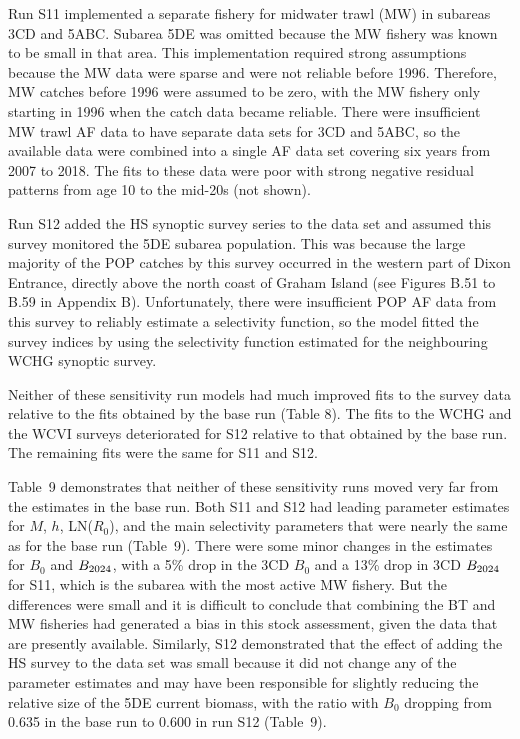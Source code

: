 \documentclass[11pt]{book}
\newcommand{\pc}{\%}
\begin{document}
Run S11 implemented a separate fishery for midwater trawl (MW) in subareas 3CD and 5ABC. 
Subarea 5DE was omitted because the MW fishery was known to be small in that area. 
This implementation required strong assumptions because the MW data were sparse and were not reliable before 1996. 
Therefore, MW catches before 1996 were assumed to be zero, with the MW fishery only starting in 1996 when the catch data became reliable. 
There were insufficient MW trawl AF data to have separate data sets for 3CD and 5ABC, so the available data were combined into a single AF data set covering six years from 2007 to 2018. 
The fits to these data were poor with strong negative residual patterns from age 10 to the mid-20s (not shown).

Run S12 added the HS synoptic survey series to the data set and assumed this survey monitored the 5DE subarea population. 
This was because the large majority of the POP catches by this survey occurred in the western part of Dixon Entrance, directly above the north coast of Graham Island (see Figures B.51 to B.59 in Appendix B). 
Unfortunately, there were insufficient POP AF data from this survey to reliably estimate a selectivity function, so the model fitted the survey indices by using the selectivity function estimated for the neighbouring WCHG synoptic survey.

Neither of these sensitivity run models had much improved fits to the survey data relative to the fits obtained by the base run (Table 8).
The fits to the WCHG and the WCVI surveys deteriorated for S12 relative to that obtained by the base run. 
The remaining fits were the same for S11 and S12.

Table~9 demonstrates that neither of these sensitivity runs moved very far from the estimates in the base run. 
Both S11 and S12 had leading parameter estimates for $M$, $h$, LN($R_0$), and the main selectivity parameters that were nearly the same as for the base run (Table~9). 
There were some minor changes in the estimates for $B_0$ and $B_{2024}$, with a 5\pc{} drop in the 3CD $B_0$ and a 13\pc{} drop in 3CD $B_{2024}$ for S11, which is the subarea with the most active MW fishery. 
But the differences were small and it is difficult to conclude that combining the BT and MW fisheries had generated a bias in this stock assessment, given the data that are presently available. 
Similarly, S12 demonstrated that the effect of adding the HS survey to the data set was small because it did not change any of the parameter estimates and may have been responsible for slightly reducing the relative size of the 5DE current biomass, with the ratio with $B_0$ dropping from 0.635 in the base run to 0.600 in run S12 (Table~9).
\end{document}
